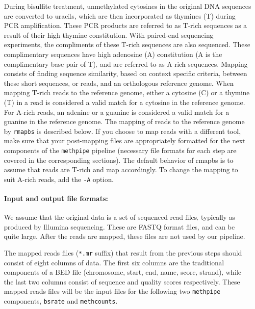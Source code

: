 \documentclass[10pt]{article}
\newcommand{\meth}{\texttt{methpipe}}
\newcommand{\prog}[1]{\texttt{#1}}
\newcommand{\fn}[1]{\texttt{#1}}
\newcommand{\op}[1]{\texttt{#1}}
\begin{document}
During bisulfite treatment, unmethylated cytosines in the original DNA
sequences are converted to uracils, which are then incorporated as
thymines (T) during PCR amplification. These PCR products are referred
to as T-rich sequences as a result of their high thymine
constitution. With paired-end sequencing experiments, the compliments
of these T-rich sequences are also sequenced.  These complimentary
sequences have high adenosine (A) constitution (A is the complimentary
base pair of T), and are referred to as A-rich sequences. Mapping
consists of finding sequence similarity, based on context specific
criteria, between these short sequences, or reads, and an orthologous
reference genome.  When mapping T-rich reads to the
reference genome, either a cytosine (C) or a thymine (T) in a read is
considered a valid match for a cytosine in the reference genome. For
A-rich reads, an adenine or a guanine is considered a valid match for
a guanine in the reference genome. The mapping of reads to the
reference genome by \prog{rmapbs} is described below. If you choose
to map reads with a different tool, make sure that your post-mapping
files are appropriately formatted for the next components of the
\meth{} pipeline (necessary file formats for each step are covered in
the corresponding sections).  The default behavior of rmapbs is to
assume that reads are T-rich and map accordingly. To change the
mapping to suit A-rich reads, add the \op{-A} option.

\paragraph{Input and output file formats:} We assume that the original
data is a set of sequenced read files, typically as produced by
Illumina sequencing. These are FASTQ format files, and can be quite
large. After the reads are mapped, these files are not used by our
pipeline.

The mapped reads files (\fn{*.mr} suffix) that result from the previous
steps should consist of eight columns of data. The first six columns
are the traditional components of a BED file (chromosome, start, end,
name, score, strand), while the last two columns consist of sequence
and quality scores respectively. These mapped reads files will be the
input files for the following two \meth{} components, \prog{bsrate}
and \prog{methcounts}.
\end{document}

